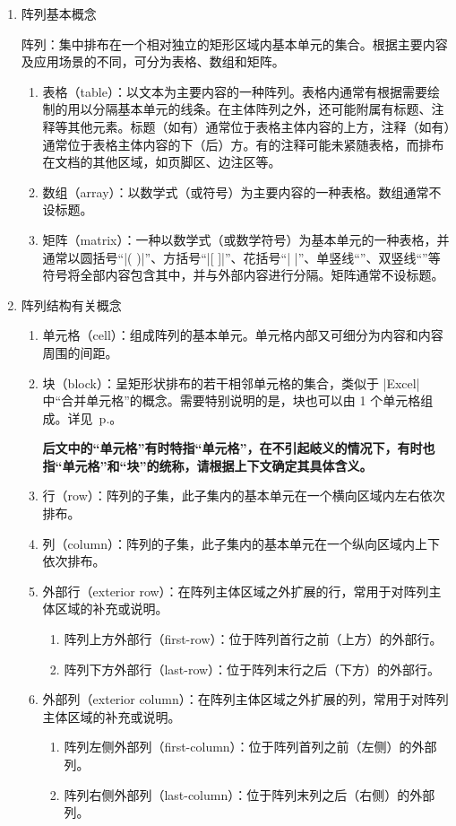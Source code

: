 \documentclass[dvipsnames]{article}%
\begin{document}
\begin{enumerate}
\item 阵列基本概念

阵列：集中排布在一个相对独立的矩形区域内基本单元的集合。根据主要内容及应用场景的不同，可分为表格、数组和矩阵。
  \begin{enumerate}
  \item 表格（table）：以文本为主要内容的一种阵列。表格内通常有根据需要绘制的用以分隔基本单元的线条。在主体阵列之外，还可能附属有标题、注释等其他元素。标题（如有）通常位于表格主体内容的上方，注释（如有）通常位于表格主体内容的下（后）方。有的注释可能未紧随表格，而排布在文档的其他区域，如页脚区、边注区等。
  \item 数组（array）：以数学式（或符号）为主要内容的一种表格。数组通常不设标题。
  \item 矩阵（matrix）：一种以数学式（或数学符号）为基本单元的一种表格，并通常以圆括号“|( )|”、方括号“|[ ]|”、花括号“|{ }|”、单竖线“\textbar \quad \textbar”、双竖线“\textbardbl \quad \textbardbl”等符号将全部内容包含其中，并与外部内容进行分隔。矩阵通常不设标题。
  \end{enumerate}
\item 阵列结构有关概念
  \begin{enumerate}
  \item 单元格（cell）：组成阵列的基本单元。单元格内部又可细分为内容和内容周围的间距。
  \item 块（block）：呈矩形状排布的若干相邻单元格的集合，类似于 |Excel| 中“合并单元格”的概念。需要特别说明的是，块也可以由 1 个单元格组成。详见~p.\pageref{Block}。
  \par
  {\bfseries{后文中的“单元格”有时特指“单元格”，在不引起岐义的情况下，有时也指“单元格”和“块”的统称，请根据上下文确定其具体含义。}}
  \item 行（row）：阵列的子集，此子集内的基本单元在一个横向区域内左右依次排布。
  \item 列（column）：阵列的子集，此子集内的基本单元在一个纵向区域内上下依次排布。
  \item 外部行（exterior row）：在阵列主体区域之外扩展的行，常用于对阵列主体区域的补充或说明。
    \begin{enumerate}
      \item 阵列上方外部行（first-row）：位于阵列首行之前（上方）的外部行。
      \item 阵列下方外部行（last-row）：位于阵列末行之后（下方）的外部行。
    \end{enumerate}
  \item 外部列（exterior column）：在阵列主体区域之外扩展的列，常用于对阵列主体区域的补充或说明。
    \begin{enumerate}
      \item 阵列左侧外部列（first-column）：位于阵列首列之前（左侧）的外部列。
      \item 阵列右侧外部列（last-column）：位于阵列末列之后（右侧）的外部列。
    \end{enumerate}
  \end{enumerate}


\end{enumerate}
\end{document}

